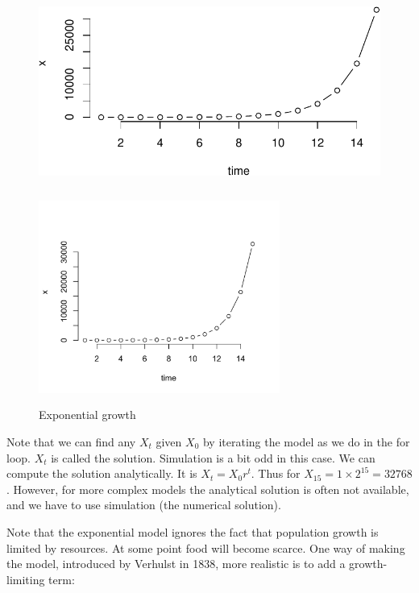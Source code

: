\documentclass[
  letterpaper,
]{scrbook}
\begin{document}
\begin{figure}[H]

{\centering \includegraphics{ch2_files/figure-pdf/unnamed-chunk-1-1.pdf}

}

\end{figure}

\begin{figure}

{\centering \includegraphics[width=3.11417in,height=2.75591in]{media/ch2/image1.jpg}

}

\caption{\label{fig-ch2-img1}Exponential growth}

\end{figure}

Note that we can find any \(X_{t}\) given \(X_{0}\) by iterating the
model as we do in the for loop. \(X_{t}\) is called the solution.
Simulation is a bit odd in this case. We can compute the solution
analytically. It is \(X_{t} = X_{0}r^{t}\). Thus for
\(X_{15} = 1 \times 2^{15} = 32768\). However, for more complex models
the analytical solution is often not available, and we have to use
simulation (the numerical solution).

Note that the exponential model ignores the fact that population growth
is limited by resources. At some point food will become scarce. One way
of making the model, introduced by Verhulst in 1838, more realistic is
to add a growth-limiting term:
\end{document}
